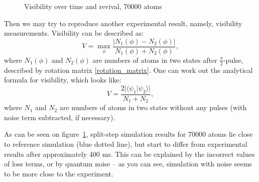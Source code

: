 \documentclass[12pt,notitlepage]{report}
\begin{document}
\begin{figure}
\begin{center}
\qquad
{}
\end{center}
\caption{Visibility over time and revival, 70000 atoms}
\label{visibility_vs_reference}
\end{figure}

Then we may try to reproduce another experimental result, namely, visibility measurements. Visibility can be described as:
\[ V = \max_{\phi} \frac{\vert N_1(\phi) - N_2(\phi) \vert}{N_1(\phi) + N_2(\phi)}, \]
where $N_1(\phi)$ and $N_2(\phi)$ are numbers of atoms in two states after $\frac{\pi}{2}$-pulse, described by rotation matrix \ref{rotation_matrix}. One can work out the analytical formula for visibility, which looks like:
\[ V = \frac{2 \vert \langle \psi_1 \vert \psi_2 \rangle \vert}{N_1 + N_2}, \]
where $N_1$ and $N_2$ are numbers of atoms in two states without any pulses (with noise term subtracted, if necessary).

As can be seen on figure~\ref{visibility_vs_reference}, split-step simulation results for 70000 atoms lie close to reference simulation (blue dotted line), but start to differ from experimental results after approximately 400 ms. This can be explained by the incorrect values of loss terms, or by quantum noise -- as you can see, simulation with noise seems to be more close to the experiment.
\end{document}
